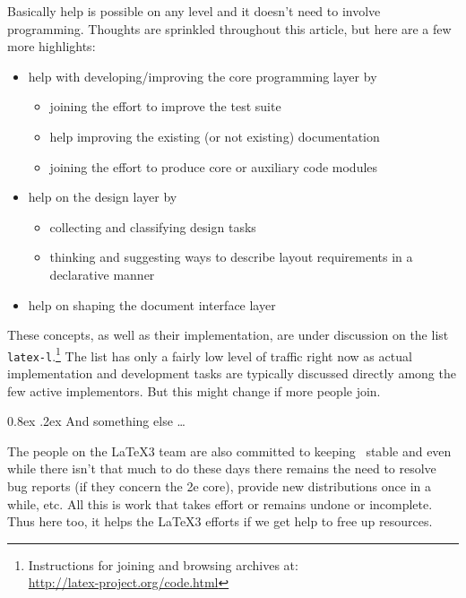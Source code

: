 \documentclass{ltnews}
\makeatletter
\newcommand{\@subheadingfont}{%
   \sffamily\slshape
   \let\LaTeX\cmssLaTeX\let\TeX\cmssTeX
}
\renewcommand{\subsection}{%
   \@startsection
      {subsection}{2}{\z@}{-1.3ex \@plus -1ex \@minus -.2ex}%
      {0.8ex \@plus.2ex}{\@subheadingfont}%
}
\makeatother
\begin{document}
Basically help is possible on any level and it doesn't need to involve programming. Thoughts are sprinkled throughout this article, but here are a few more highlights:
\begin{itemize}
\item help with developing/improving the core programming layer by
\begin{itemize}[nosep]
\item joining the effort to improve the test suite
\item help improving the existing (or not existing) documentation
\item joining the effort to produce core or auxiliary code modules
\end{itemize}
\item help on the design layer by
\begin{itemize}[nosep]
\item collecting and classifying design tasks
\item thinking and suggesting ways to describe layout requirements in a declarative manner
\end{itemize}
\item help on shaping the document interface layer
\end{itemize}
These concepts, as well as their implementation, are under discussion on the list \texttt{latex-l}.\footnote{Instructions for joining and browsing archives at:\\ \url{http://latex-project.org/code.html}}
The list has only a fairly low level of traffic right now as actual implementation and development tasks are typically discussed directly among the few active implementors. But this might change if more people join.

\subsection{And something else \dots}

The people on the \LaTeX3 team are also committed to keeping \LaTeXe\ stable and even while there isn't that much to do these days there remains the need to resolve bug reports (if they concern the 2e core), provide new distributions once in a while, etc. All this is work that takes effort or remains undone or incomplete. Thus here too, it helps the \LaTeX3 efforts if we get help to free up resources.
\end{document}

